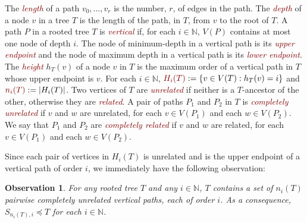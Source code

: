 \documentclass[kpfonts,lotsofwhite]{patmorin}
\newcommand{\defn}[1]{\textcolor{Maroon}{\emph{#1}}}
\newcommand{\mathdefn}[1]{\textcolor{Maroon}{#1}}
\newcommand{\N}{\mathbb{N}}
\DeclarePairedDelimiter{\floor}{\lfloor}{\rfloor}
\newcommand{\PP}{\mathcal{P}}
\theoremstyle{plain}
\newtheorem{obs}[thm]{Observation}
\theoremstyle{definition}
\begin{document}

The \defn{length} of a path $v_0,\ldots,v_r$ is the number, $r$, of edges in the path. The \defn{depth} of a node $v$ in a tree $T$ is the length of the path, in $T$, from $v$ to the root of $T$. A path $P$ in a rooted tree $T$ is \defn{vertical} if, for each $i\in\N$, $V(P)$ contains at most one node of depth $i$. The node of minimum-depth in a vertical path is its \defn{upper endpoint} and the node of maximum depth in a vertical path is its \defn{lower endpoint}.  The \defn{height} $h_T(v)$ of a node $v$ in $T$ is the maximum order of a vertical path in $T$ whose upper endpoint is $v$.  For each $i\in\N$, $\mathdefn{H_i(T)}:=\{v\in V(T):h_T(v)=i\}$ and $\mathdefn{n_i(T)}:=|H_i(T)|$.  Two vertices of $T$ are \defn{unrelated} if neither is a $T$-ancestor of the other, otherwise they are \defn{related}.  A pair of paths $P_1$ and $P_2$ in $T$ is \defn{completely unrelated} if $v$ and $w$ are unrelated, for each $v\in V(P_1)$ and each $w\in V(P_2)$.  We say that $P_1$ and $P_2$ are \defn{completely related} if $v$ and $w$ are related, for each $v\in V(P_1)$ and each $w\in V(P_2)$.



Since each pair of vertices in $H_i(T)$ is unrelated and is the upper endpoint of a vertical path of order $i$, we immediately have the following observation:

\begin{obs}\label{same_height_unrelated}
  For any rooted tree $T$ and any $i\in\N$, $T$ contains a set of $n_i(T)$ pairwise completely unrelated vertical paths, each of order $i$.  As a consequence, $S_{n_i(T),i}\preceq T$ for each $i\in\N$.
\end{obs}
\end{document}

